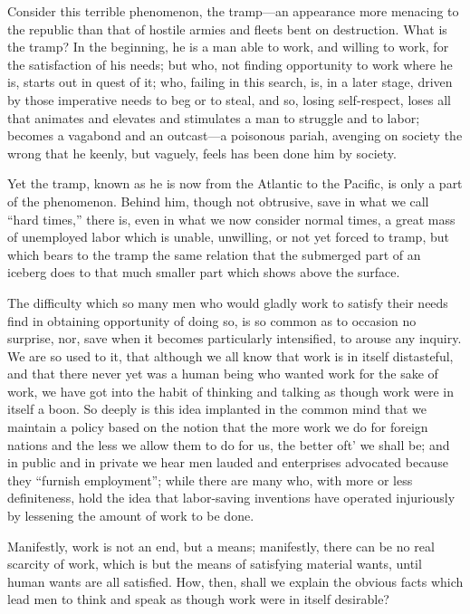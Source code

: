 \documentclass{book}
\begin{document}
Consider this terrible phenomenon, the tramp—an appearance more menacing to the republic than that of hostile armies and fleets bent on destruction. What is the tramp? In the beginning, he is a man able to work, and willing to work, for the satisfaction of his needs; but who, not finding opportunity to work where he is, starts out in quest of it; who, failing in this search, is, in a later stage, driven by those imperative needs to beg or to steal, and so, losing self-respect, loses all that animates and elevates and stimulates a man to struggle and to labor; becomes a vagabond and an outcast—a poisonous pariah, avenging on society the wrong that he keenly, but vaguely, feels has been done him by society.

Yet the tramp, known as he is now from the Atlantic to the Pacific, is only a part of the phenomenon. Behind him, though not obtrusive, save in what we call “hard times,” there is, even in what we now consider normal times, a great mass of unemployed labor which is unable, unwilling, or not yet forced to tramp, but which bears to the tramp the same relation that the submerged part of an iceberg does to that much smaller part which shows above the surface.

The difficulty which so many men who would gladly work to satisfy their needs find in obtaining opportunity of doing so, is so common as to occasion no surprise, nor, save when it becomes particularly intensified, to arouse any inquiry. We are so used to it, that although we all know that work is in itself distasteful, and that there never yet was a human being who wanted work for the sake of work, we have got into the habit of thinking and talking as though work were in itself a boon. So deeply is this idea implanted in the common mind that we maintain a policy based on the notion that the more work we do for foreign nations and the less we allow them to do for us, the better oft’ we shall be; and in public and in private we hear men lauded and enterprises advocated because they “furnish employment”; while there are many who, with more or less definiteness, hold the idea that labor-saving inventions have operated injuriously by lessening the amount of work to be done.

Manifestly, work is not an end, but a means; manifestly, there can be no real scarcity of work, which is but the means of satisfying material wants, until human wants are all satisfied. How, then, shall we explain the obvious facts which lead men to think and speak as though work were in itself desirable?
\end{document}
